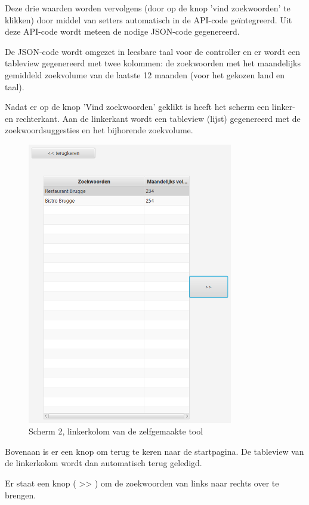 Deze drie waarden worden vervolgens (door op de knop 'vind zoekwoorden' te klikken) door middel van setters automatisch in de API-code geïntegreerd. Uit deze API-code wordt meteen de nodige JSON-code gegenereerd. 

De JSON-code wordt omgezet in leesbare taal voor de controller en er wordt een tableview gegenereerd met twee kolommen: de zoekwoorden met het maandelijks gemiddeld zoekvolume van de laatste 12 maanden (voor het gekozen land en taal). 

Nadat er op de knop 'Vind zoekwoorden' geklikt is heeft het scherm een linker- en rechterkant. Aan de linkerkant wordt een tableview (lijst) gegenereerd met de zoekwoordsuggesties en het bijhorende zoekvolume. 

\begin{figure}[h!]
\centering
\includegraphics[width=0.8\textwidth]{img/scherm2linkerkant.PNG}
\caption{Scherm 2, linkerkolom van de zelfgemaakte tool}
\end{figure}

Bovenaan is er een knop om terug te keren naar de startpagina. De tableview van de linkerkolom wordt dan automatisch terug geledigd. 

Er staat een knop ( >> ) om de zoekwoorden van links naar rechts over te brengen. 

